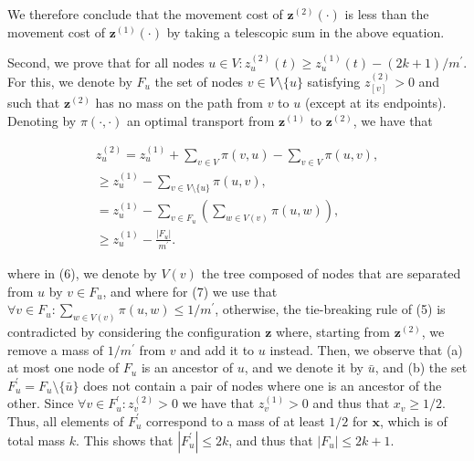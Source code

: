 \documentclass[10pt,a4paper]{article}
\begin{document}
\par




We therefore conclude that the movement cost of ${\mathbf{z}}^{(2)}(\cdot)$ is less than the movement cost of ${\mathbf{z}}^{(1)}(\cdot)$ by taking a telescopic sum in the above equation.\par




Second, we prove that for all nodes $u\in V\colon z^{(2)}_{u}(t)\geq z^{(1)}_{u}(t)-(2k+1)/m^{\prime}$. For this, we denote by $F_{u}$ the set of nodes $v\in V\setminus\{u\}$ satisfying $z^{(2)}_{[v]}>0$ and such that ${\mathbf{z}}^{(2)}$ has no mass on the path from $v$ to $u$ (except at its endpoints). Denoting by $\pi(\cdot,\cdot)$ an optimal transport from ${\mathbf{z}}^{(1)}$ to ${\mathbf{z}}^{(2)}$, we have that\par


\[\begin{gathered}
\displaystyle z^{(2)}_{u} \displaystyle=z^{(1)}_{u}+\sum_{v\in V}\pi(v,u)-\sum_{v\in V}\pi(u,v), \\
\displaystyle\geq z^{(1)}_{u}-\sum_{v\in V\setminus\{u\}}\pi(u,v), \\
\displaystyle=z^{(1)}_{u}-\sum_{v\in F_{u}}\left(\sum_{w\in V(v)}\pi(u,w)\right), \\
\displaystyle\geq z^{(1)}_{u}-\frac{|F_{u}|}{m^{\prime}}.
\end{gathered}\]


where in (6), we denote by $V(v)$ the tree composed of nodes that are separated from $u$ by $v\in F_{u}$, and where for (7) we use that $\forall v\in F_{u}\colon\sum_{w\in V(v)}\pi(u,w)\leq 1/m^{\prime}$, otherwise, the tie-breaking rule of (5) is contradicted by considering the configuration ${\mathbf{z}}$ where, starting from ${\mathbf{z}}^{(2)}$, we remove a mass of $1/m^{\prime}$ from $v$ and add it to $u$ instead. Then, we observe that (a) at most one node of $F_{u}$ is an ancestor of $u$, and we denote it by $\bar{u}$, and (b) the set $F_{u}^{\prime}=F_{u}\setminus\{\bar{u}\}$ does not contain a pair of nodes where one is an ancestor of the other. Since $\forall v\in F_{u}^{\prime}\colon z^{(2)}_{v}>0$ we have that $z^{(1)}_{v}>0$ and thus that $x_{v}\geq 1/2$. Thus, all elements of $F_{u}^{\prime}$ correspond to a mass of at least $1/2$ for ${\boldsymbol{x}}$, which is of total mass $k$. This shows that $|F_{u}^{\prime}|\leq 2k$, and thus that $|F_{u}|\leq 2k+1$.\par
\end{document}
